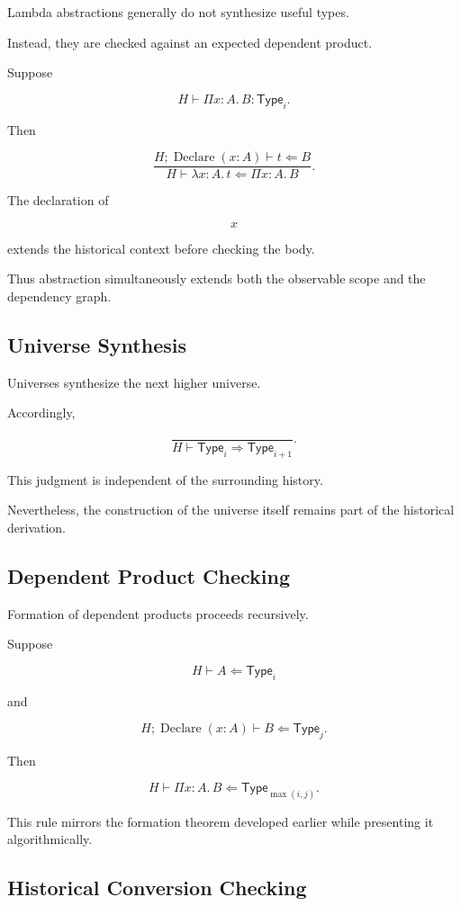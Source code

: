 \documentclass[12pt,oneside]{article}
\theoremstyle{definition}
\theoremstyle{remark}
\newcommand{\Type}{\mathsf{Type}}
\begin{document}
Lambda abstractions generally do not synthesize useful types.

Instead, they are checked against an expected dependent product.

Suppose

\[
H
\vdash
\Pi x:A.\,B
:
\Type_i.
\]

Then

\[
\frac{
H;
\operatorname{Declare}(x:A)
\vdash
t
\Leftarrow
B
}{
H
\vdash
\lambda x:A.\,t
\Leftarrow
\Pi x:A.\,B
}.
\]

The declaration of

\[
x
\]

extends the historical context before checking the body.

Thus abstraction simultaneously extends both the observable scope and the
dependency graph.

\subsection{Universe Synthesis}

Universes synthesize the next higher universe.

Accordingly,

\[
\frac{}{
H
\vdash
\Type_i
\Rightarrow
\Type_{i+1}
}.
\]

This judgment is independent of the surrounding history.

Nevertheless, the construction of the universe itself remains part of the
historical derivation.

\subsection{Dependent Product Checking}

Formation of dependent products proceeds recursively.

Suppose

\[
H
\vdash
A
\Leftarrow
\Type_i
\]

and

\[
H;
\operatorname{Declare}(x:A)
\vdash
B
\Leftarrow
\Type_j.
\]

Then

\[
H
\vdash
\Pi x:A.\,B
\Leftarrow
\Type_{\max(i,j)}.
\]

This rule mirrors the formation theorem developed earlier while presenting it
algorithmically.

\subsection{Historical Conversion Checking}
\end{document}

